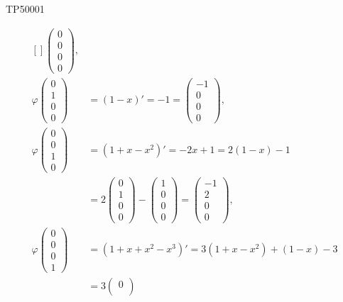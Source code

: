 \begin{corrige}{TP50001}
\begin{enumerate}
\begin{equation}
\begin{aligned}[]
\begin{pmatrix}
						0	\\ 
						0	\\ 
						0	\\ 
						0	
					\end{pmatrix},\\
					\varphi\begin{pmatrix}
						0	\\ 
						1	\\ 
						0	\\ 
						0	
					\end{pmatrix}&=(1-x)'=-1=\begin{pmatrix}
						-1	\\ 
						0	\\ 
						0	\\ 
						0	
					\end{pmatrix},\\
					\varphi\begin{pmatrix}
						0	\\ 
						0	\\ 
						1	\\ 
						0	
					\end{pmatrix}&=(1+x-x^2)'=-2x+1=2(1-x)-1\\
					&=2\begin{pmatrix}
						0	\\ 
						1	\\ 
						0	\\ 
						0	
					\end{pmatrix}-\begin{pmatrix}
						1	\\ 
						0	\\ 
						0	\\ 
						0	
					\end{pmatrix}=\begin{pmatrix}
						-1	\\ 
						2	\\ 
						0	\\ 
						0	
					\end{pmatrix},\\
					\varphi\begin{pmatrix}
						0	\\ 
						0	\\ 
						0	\\ 
						1	
					\end{pmatrix}&=(1+x+x^2-x^3)'=3(1+x-x^2)+(1-x)-3\\
					&=3\begin{pmatrix}
						0	\\ 

\end{pmatrix}
\end{aligned}
\end{equation}
\end{enumerate}
\end{corrige}

